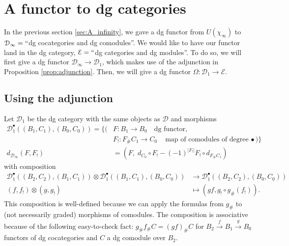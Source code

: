 \section{A functor to dg categories}
In the previous section \ref{sec:A_infinity},
we gave a dg functor from $U(\chi_\infty)$ 
to $\mathcal{D}_\infty = ``$dg cocategories 
and dg comodules''. We would like to have our 
functor land in the dg category, 
$\mathcal{E} = ``$dg categories and dg 
modules''. To do so, we will first give a 
dg functor $\mathcal{D}_\infty \to 
\mathcal{D}_1$, 
which makes use of the adjunction in 
Proposition \ref{prop:adjunction}. Then, 
we will give a dg functor $\Omega: 
\mathcal{D}_1 \to \mathcal{E}$.

\subsection{Using the adjunction}
Let $\mathcal{D}_1$ be the 
dg category with the same objects 
as $\mathcal{D}$ and morphisms
\begin{align*}
\mathcal{D}_1^\bullet(
  (B_1, C_1), (B_0,C_0))
= \big\{ \big(
& F: 
B_1 \to B_0 \quad \textrm{dg functor},\\
& F_!:
F_{\#}C_1 \to C_0 \quad \textrm{map of 
comodules of degree $\bullet$}
\big) \big\}\\
d_{\mathcal{D}_\infty}(F,F_!)
&=
(F,\; d_{C_0} \circ F_! - (-1)^{|F_!|} 
F_! \circ d_{F_\# C_1})
\end{align*}
with composition
\begin{align*}  
\mathcal{D}_1^\bullet(
  (B_2, C_2), (B_1, C_1)) \otimes  
  \mathcal{D}_1^\bullet(
  (B_1, C_1), (B_0, C_0))
&\to
\mathcal{D}_1^\bullet(
  (B_2, C_2), (B_0, C_0))\\
(f,f_!) \otimes (g, g_!)
&\mapsto
(gf, g_!\circ g_\#(f_!)).
\end{align*}
This composition is well-defined because 
we can apply the formulas from $g_\#$ to 
(not necessarily graded) morphisms of 
comodules. The composition is associative 
because of the following easy-to-check 
fact: $g_\#f_\#C = (gf)_\#C$ for 
$B_2 \xrightarrow{f} B_1 \xrightarrow{g} 
B_0$ functors of dg cocategories and $C$ 
a dg comodule over $B_2$.

